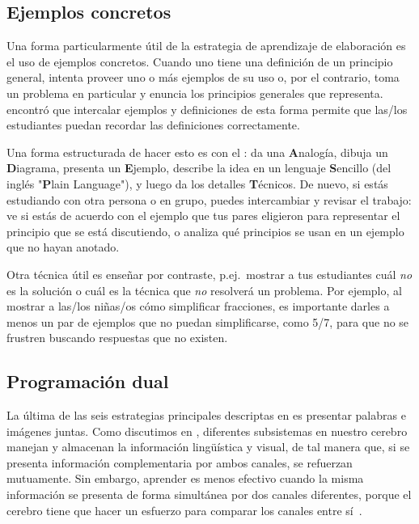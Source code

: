 \subsection*{Ejemplos concretos}

Una forma particularmente útil de la estrategia de aprendizaje de elaboración es el uso de ejemplos concretos.
Cuando uno tiene una definición de un principio general,
intenta proveer uno o más ejemplos de su uso
o, por el contrario, toma un problema en particular y enuncia los principios generales que representa.
\cite{Raws2014} encontró que intercalar ejemplos y definiciones de esta forma
permite que las/los estudiantes puedan recordar las definiciones correctamente.

Una forma estructurada de hacer esto es con
el :
da una \textbf{A}nalogía,
dibuja un \textbf{D}iagrama,
presenta un \textbf{E}jemplo,
describe la idea en un lenguaje \textbf{S}encillo (del inglés "\textbf{P}lain Language"),
y luego da los detalles \textbf{T}écnicos.
De nuevo,
si estás estudiando con otra persona o en grupo,
puedes intercambiar y revisar el trabajo:
ve si estás de acuerdo con el ejemplo que tus pares eligieron para representar
el principio que se está discutiendo,
o analiza qué principios se usan en un ejemplo que no hayan anotado.

Otra técnica útil es enseñar por contraste,
p.ej.\ mostrar a tus estudiantes cuál \emph{no} es la solución
o cuál es la técnica que \emph{no} resolverá un problema.
Por ejemplo,
al mostrar a las/los niñas/os cómo simplificar fracciones,
es importante darles a menos un par de ejemplos que no puedan simplificarse, como 5/7,
para que no se frustren buscando respuestas que no existen.

\subsection*{Programación dual}

La última de las seis estrategias principales
descriptas en 
es presentar palabras e imágenes juntas.
Como discutimos en ,
diferentes subsistemas en nuestro cerebro manejan y almacenan la información lingüística y visual,
de tal manera que, si se presenta información complementaria por ambos canales,
se refuerzan mutuamente.
Sin embargo,
aprender es menos efectivo cuando la misma información se presenta de forma simultánea por dos canales diferentes,
porque el cerebro tiene que hacer un esfuerzo para comparar los canales entre sí~\cite{Maye2003}.

